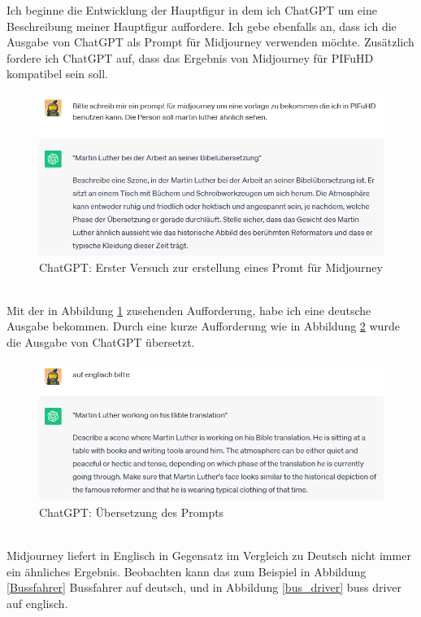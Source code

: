 \documentclass[10pt,a4paper,bibliography=totocnumbered,listof=totocnumbered]{scrartcl}
\begin{document}
Ich beginne die Entwicklung der Hauptfigur in dem ich ChatGPT um eine Beschreibung meiner Hauptfigur auffordere. Ich gebe ebenfalls an, dass ich die Ausgabe von ChatGPT als Prompt für Midjourney verwenden möchte. Zusätzlich fordere ich ChatGPT auf, dass das Ergebnis von Midjourney für PIFuHD kompatibel sein soll.
\begin{figure}[h]
	 \centering
\includegraphics[width=14cm]{BilderFuerBA/CGPTMidJourneyMartinLuther/02.png}
   		 \caption{ChatGPT: Erster Versuch zur erstellung eines Promt für Midjourney}
   		 \label{ChatGPT_erster_Versuch_Midjourney_Promt}
\end{figure}
\\
Mit der in Abbildung \ref{ChatGPT_erster_Versuch_Midjourney_Promt} zusehenden Aufforderung, habe ich eine deutsche Ausgabe bekommen. Durch eine kurze Aufforderung wie in Abbildung \ref{ChatGPT_übersetzen} wurde die Ausgabe von ChatGPT übersetzt.
\begin{figure}[h]
    \centering
    \includegraphics[width=14cm]{BilderFuerBA/CGPTMidJourneyMartinLuther/03.png}
    \caption{ChatGPT: Übersetzung des Prompts}
    \label{ChatGPT_übersetzen}
\end{figure}
\\
Midjourney liefert in Englisch in Gegensatz im Vergleich zu Deutsch nicht immer ein ähnliches Ergebnis. Beobachten kann das zum Beispiel in Abbildung \ref{Bussfahrer} Bussfahrer auf deutsch, und in Abbildung \ref{bus_driver} buss driver auf englisch.
\end{document}
